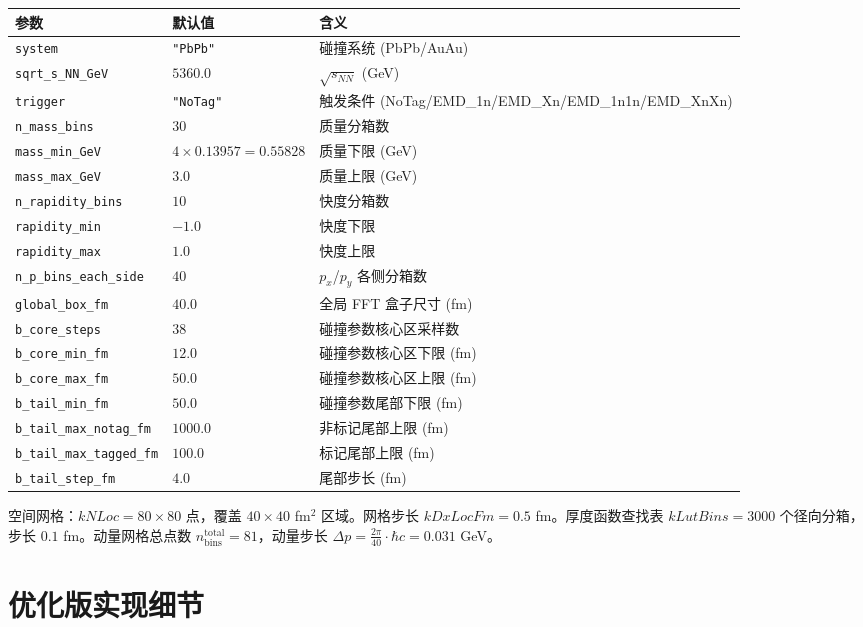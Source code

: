 \documentclass[11pt,a4paper,UTF8]{ctexart}
\begin{document}
\begin{longtable}{l l l}
\toprule
\textbf{参数} & \textbf{默认值} & \textbf{含义} \\
\midrule
\texttt{system} & \texttt{"PbPb"} & 碰撞系统 (PbPb/AuAu) \\
\texttt{sqrt\_s\_NN\_GeV} & $5360.0$ & $\sqrt{s_{NN}}$ (GeV) \\
\texttt{trigger} & \texttt{"NoTag"} & 触发条件 (NoTag/EMD\_1n/EMD\_Xn/EMD\_1n1n/EMD\_XnXn) \\
\texttt{n\_mass\_bins} & $30$ & 质量分箱数 \\
\texttt{mass\_min\_GeV} & $4 \times 0.13957 = 0.55828$ & 质量下限 (GeV) \\
\texttt{mass\_max\_GeV} & $3.0$ & 质量上限 (GeV) \\
\texttt{n\_rapidity\_bins} & $10$ & 快度分箱数 \\
\texttt{rapidity\_min} & $-1.0$ & 快度下限 \\
\texttt{rapidity\_max} & $1.0$ & 快度上限 \\
\texttt{n\_p\_bins\_each\_side} & $40$ & $p_x$/$p_y$ 各侧分箱数 \\
\texttt{global\_box\_fm} & $40.0$ & 全局 FFT 盒子尺寸 (fm) \\
\texttt{b\_core\_steps} & $38$ & 碰撞参数核心区采样数 \\
\texttt{b\_core\_min\_fm} & $12.0$ & 碰撞参数核心区下限 (fm) \\
\texttt{b\_core\_max\_fm} & $50.0$ & 碰撞参数核心区上限 (fm) \\
\texttt{b\_tail\_min\_fm} & $50.0$ & 碰撞参数尾部下限 (fm) \\
\texttt{b\_tail\_max\_notag\_fm} & $1000.0$ & 非标记尾部上限 (fm) \\
\texttt{b\_tail\_max\_tagged\_fm} & $100.0$ & 标记尾部上限 (fm) \\
\texttt{b\_tail\_step\_fm} & $4.0$ & 尾部步长 (fm) \\
\bottomrule
\end{longtable}

空间网格：$kNLoc = 80 \times 80$ 点，覆盖 $40 \times 40$ fm$^2$ 区域。网格步长 $kDxLocFm = 0.5$ fm。厚度函数查找表 $kLutBins = 3000$ 个径向分箱，步长 $0.1$ fm。动量网格总点数 $n_{\text{bins}}^{\text{total}} = 81$，动量步长 $\Delta p = \frac{2\pi}{40} \cdot \hbar c = 0.031$ GeV。

\section{优化版实现细节}
\end{document}
